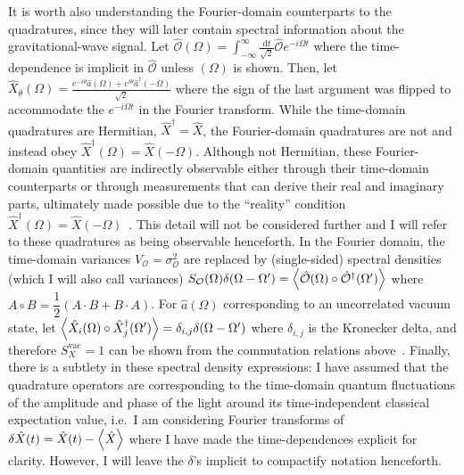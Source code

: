 It is worth also understanding the Fourier-domain counterparts to the quadratures, since they will later contain spectral information about the gravitational-wave signal. %
Let $\hat{\mathcal{O}}(\Omega) = \int_{-\infty}^\infty \frac{\mathrm{d}t}{\sqrt{2}} \hat{\mathcal{O}} e^{-i\Omega t}$ where the time-dependence is implicit in $\hat{\mathcal{O}}$ unless $(\Omega)$ is shown. Then, let $\hat{X}_\theta(\Omega)=\frac{e^{-i \theta}\hat{a}(\Omega)+e^{i \theta}\hat{a}^\dag(-\Omega)}{\sqrt{2}}$ where the sign of the last argument was flipped to accommodate the $e^{-i\Omega t}$ in the Fourier transform. While the time-domain quadratures are Hermitian, $\hat{X}^\dag=\hat{X}$, the Fourier-domain quadratures are not and instead obey $\hat{X}^\dag(\Omega)=\hat{X}(-\Omega)$. Although not Hermitian, these Fourier-domain quantities are indirectly observable either through their time-domain counterparts or through measurements that can derive their real and imaginary parts, ultimately made possible due to the ``reality'' condition $\hat{X}^\dag(\Omega)=\hat{X}(-\Omega)$~\cite{sourcecitedinReid}. This detail will not be considered further and I will refer to these quadratures as being observable henceforth. 
In the Fourier domain, the time-domain variances $V_\mathcal{O}=\sigma_\mathcal{O}^2$ are replaced by (single-sided) spectral densities (which I will also call variances) $S_\mathcal{O}(\Omega)\delta(\Omega-\Omega')=\ev{\hat{\mathcal{O}}(\Omega)\circ\hat{\mathcal{O}}^\dag(\Omega')}$ where $A\circ B=\dfrac{1}{2}(A\cdot B+B\cdot A)$. For $\hat{a}(\Omega)$ corresponding to an uncorrelated vacuum state, let $\ev{\hat{X}_i(\Omega)\circ\hat{X}_j^\dag(\Omega')}=\delta_{i,j}\delta(\Omega-\Omega')$ where $\delta_{i,j}$ is the Kronecker delta, and therefore $S_X^\text{vac}=1$ can be shown from the commutation relations above~\cite{Danilishin}. Finally, there is a subtlety in these spectral density expressions: I have assumed that the quadrature operators are corresponding to the time-domain quantum fluctuations of the amplitude and phase of the light around its time-independent classical expectation value, i.e.\ I am considering Fourier transforms of $\delta\hat{X}(t)=\hat{X}(t)-\ev{\hat{X}}$ where I have made the time-dependences explicit for clarity. However, I will leave the $\delta$'s implicit to compactify notation henceforth.



